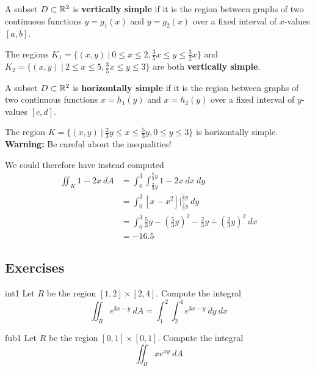 \begin{definition}
    A subset $D \subset \mathbb{R}^2$ is \textbf{vertically simple} if it is the region between graphs of two continuous functions $y = g_1(x)$ and $y = g_2(x)$ over a fixed interval of $x$-values $[a,b]$.
\end{definition}

\begin{example}
   The regions $K_1 = \{(x,y) \ | \ 0 \leq x \leq 2, \frac{3}{5}x \leq y \leq \frac{3}{2}x\}$ and $K_2 = \{(x,y) \ | \ 2 \leq x \leq 5, \frac{3}{5}x \leq y \leq 3 \}$ are both \textbf{vertically simple}. 
\end{example}

\begin{definition}
    A subset $D \subset \mathbb{R}^2$ is \textbf{horizontally simple} if it is the region between graphs of two continuous functions $x = h_1(y)$ and $x = h_2(y)$  over a fixed interval of $y$-values $[c,d]$.
\end{definition}

\begin{example}
    The region $K = \{(x,y) \ | \ \frac{2}{3}y \leq x \leq \frac{5}{3}y, 0 \leq y \leq 3\}$ is horizontally simple.  \textbf{Warning:} Be careful about the inequalities!

    We could therefore have instead computed 
    \begin{align*}
        \iint_K 1-2x \ dA &= \int_0^3\int_{\frac{2}{3}y}^{\frac{5}{3}y} 1-2x \ dx \ dy \\
        &= \int_0^3 [x-x^2] \bigg|_{\frac{2}{3}y}^{\frac{5}{3}y} \ dy\\
        &= \int_0^3 \frac{5}{3}y - (\frac{5}{3}y)^2 - \frac{2}{3}y + (\frac{2}{3}y)^2 \ dx \\
        &= -16.5        
    \end{align*}
\end{example}

\subsection{Exercises}

\begin{problem}{int1}
    Let $R$ be the region $[1,2] \times [2,4]$.  Compute the integral 
        $$\iint_R e^{3x-y} \ dA = \int_1^2\int_2^4 e^{3x-y} \ dy \ dx$$
\end{problem}

\begin{problem}{fub1}
    Let $R$ be the region $[0,1] \times [0,1]$.  Compute the integral 
        $$\iint_R xe^{xy} \ dA $$
\end{problem}

